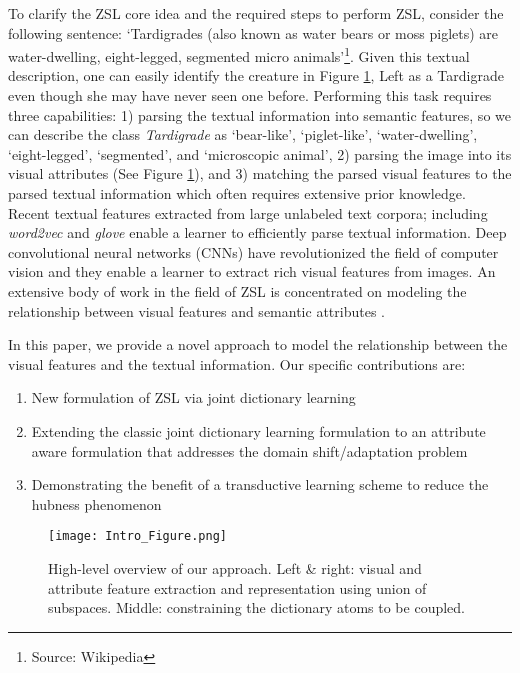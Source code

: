 \documentclass[letterpaper]{article} %
\begin{document}
To clarify the  ZSL core idea and the required steps to perform ZSL, consider the following sentence: `Tardigrades (also known as water bears or moss piglets) are water-dwelling, eight-legged, segmented micro animals'\footnote{Source: Wikipedia}. Given this textual description, one can easily identify the creature in Figure \ref{fig:tardigrade}, Left as a Tardigrade even though she may have never seen one before. Performing this task requires three capabilities: 1) parsing the textual information into semantic features, so we can describe the class {\it Tardigrade} as `bear-like', `piglet-like', `water-dwelling', `eight-legged', `segmented', and `microscopic animal', 2) parsing the image into its visual attributes (See Figure \ref{fig:tardigrade}), and 3) matching the parsed visual features to the parsed textual information which often requires extensive prior knowledge.   Recent textual features extracted from large unlabeled text corpora; including {\it word2vec} \cite{mikolov2013distributed} and {\it glove} \cite{pennington2014glove} enable a learner to efficiently parse textual information. Deep convolutional neural networks (CNNs) \cite{krizhevsky2012imagenet,simonyan2014very,he2016deep,huang2017densely} have revolutionized the field of computer vision and they enable a learner to extract rich visual features from images. An extensive body of work in the field of ZSL is concentrated on modeling the relationship between visual features and semantic attributes
\cite{palatucci2009zero,akata2013label,socher2013zero,norouzi2013zero,lampert2014attribute,zhang2015zero,ding2017lowrank}. 

In this paper, we provide a novel approach to model the relationship between the visual features and the textual information. Our specific contributions are:
\begin{enumerate}
\item New formulation of ZSL via joint dictionary learning
\item Extending the classic joint dictionary learning formulation to an attribute aware formulation that addresses the domain shift/adaptation problem \cite{kodirov2015unsupervised}
\item Demonstrating the benefit of a transductive learning scheme to reduce the hubness phenomenon \cite{dinu2014improving,shigeto2015ridge} 
\end{enumerate}

\begin{figure} 
        \texttt{[image: Intro\_Figure.png]}      
   \caption{High-level overview of our  approach. Left \& right: visual and attribute feature extraction and   representation using union of subspaces. Middle:  constraining the dictionary atoms to be coupled. }
\label{fig:tardigrade}
\end{figure}
\end{document}
